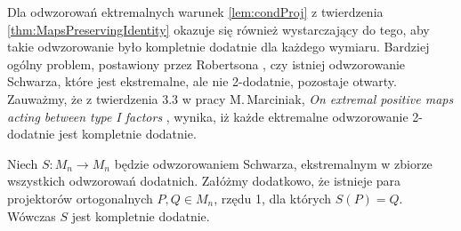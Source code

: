 Dla odwzorowań ektremalnych warunek \ref{lem:condProj} z
twierdzenia \ref{thm:MapsPreservingIdentity} okazuje się również wystarczający
do tego, aby takie odwzorowanie było kompletnie dodatnie dla każdego wymiaru.
Bardziej ogólny problem, postawiony przez Robertsona
\cite{robertson1983schwarz},
czy istniej odwzorowanie Schwarza, które jest ekstremalne, ale
nie 2-dodatnie, pozostaje otwarty.
Zauważmy, że z twierdzenia 3.3 w pracy
M.\,Marciniak, \emph{On extremal positive maps acting between type I factors}
\cite{marciniak2008extremal}, wynika, iż
każde ektremalne odwzorowanie 2-dodatnie jest kompletnie dodatnie.

\begin{Theorem}
\label{thm:ExtremalSchwarz}
Niech $S: M_{n} \rightarrow M_{n}$
będzie odwzorowaniem Schwarza, ekstremalnym w zbiorze wszystkich odwzorowań
dodatnich. Załóżmy dodatkowo, że
istnieje para projektorów ortogonalnych $P, Q \in M_{n}$, rzędu 1,
dla których $S(P) = Q$.
Wówczas $S$ jest kompletnie dodatnie.
\end{Theorem}
